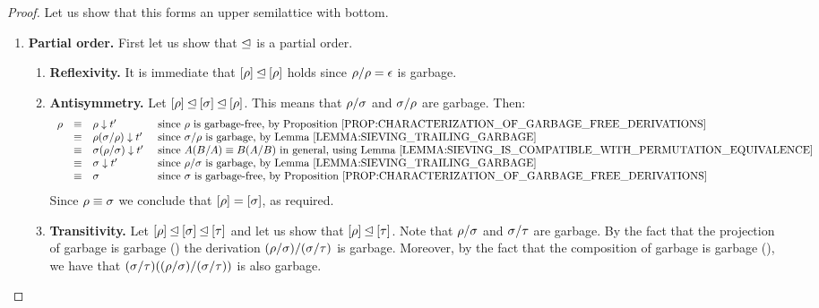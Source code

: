 \begin{proof}
Let us show that this forms an upper semilattice with bottom.
\begin{enumerate}
\item {\bf Partial order.}
  First let us show that $\unlhd$ is a partial order.
  \begin{enumerate}
  \item {\bf Reflexivity.}
    It is immediate that ${[\rho]} \unlhd {[\rho]}$ holds since $\rho/\rho = \epsilon$ is garbage.
  \item {\bf Antisymmetry.}
    Let ${[\rho]} \unlhd {[\sigma]} \unlhd {[\rho]}$.
    This means that $\rho/\sigma$ and $\sigma/\rho$ are garbage.
    Then:
    \[
      \begin{array}{rcll}
      \redseq
      & \permeq & \redseq \sieve \tm' & \text{ since $\redseq$ is garbage-free, by \rprop{characterization_of_garbage_free_derivations}} \\
      & \permeq & \redseq(\redseqtwo/\redseq) \sieve \tm' & \text{ since $\redseqtwo/\redseq$ is garbage, by \rlem{sieving_trailing_garbage}} \\
      & \permeq & \redseqtwo(\redseq/\redseqtwo) \sieve \tm' & \text{ since $A(B/A) \permeq B(A/B)$ in general, using \rlem{sieving_is_compatible_with_permutation_equivalence}} \\
      & \permeq & \redseqtwo \sieve \tm' & \text{ since $\redseq/\redseqtwo$ is garbage, by \rlem{sieving_trailing_garbage}} \\
      & \permeq & \redseqtwo & \text{ since $\redseqtwo$ is garbage-free, by \rprop{characterization_of_garbage_free_derivations}} \\
      \end{array}
    \]
    Since $\rho \equiv \sigma$ we conclude that ${[\rho]} = {[\sigma]}$,
    as required.
  \item {\bf Transitivity.}
    Let ${[\rho]} \unlhd {[\sigma]} \unlhd {[\tau]}$
    and let us show that ${[\rho]} \unlhd {[\tau]}$.
    Note that $\rho/\sigma$ and $\sigma/\tau$ are garbage.
    By the fact that the projection of garbage is garbage ()
    the derivation $(\rho/\sigma)/(\sigma/\tau)$ is garbage.
    Moreover, by the fact that the composition of garbage is garbage (),
    we have that $(\sigma/\tau)((\rho/\sigma)/(\sigma/\tau))$ is also garbage.

\end{enumerate}
\end{enumerate}
\end{proof}
